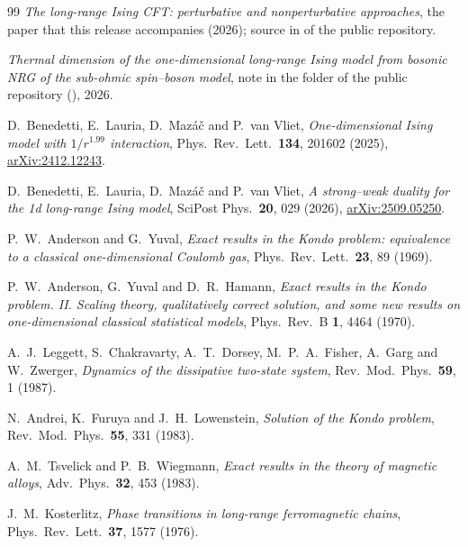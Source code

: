 \documentclass[11pt,a4paper]{article}
\numberwithin{equation}{section}
\newcommand{\file}[1]{\path{#1}}
\begin{document}
{}
\begin{thebibliography}{99}
\emph{The long-range Ising CFT: perturbative and nonperturbative approaches}, the paper that this
release accompanies (2026); source in \file{paper/} of the public repository.

\emph{Thermal dimension of the one-dimensional long-range Ising model from bosonic NRG of the sub-ohmic spin--boson
model}, note in the folder \file{NRG/} of the public repository (\file{NRG/note/lri_nrg_1d_note.pdf}), 2026.

D.~Benedetti, E.~Lauria, D.~Maz\'a\v c and P.~van Vliet,
\emph{One-dimensional Ising model with $1/r^{1.99}$ interaction},
Phys.\ Rev.\ Lett.\ \textbf{134}, 201602 (2025),
\href{https://arxiv.org/abs/2412.12243}{arXiv:2412.12243}.

D.~Benedetti, E.~Lauria, D.~Maz\'a\v c and P.~van Vliet,
\emph{A strong--weak duality for the 1d long-range Ising model},
SciPost Phys.\ \textbf{20}, 029 (2026),
\href{https://arxiv.org/abs/2509.05250}{arXiv:2509.05250}.

P.~W.~Anderson and G.~Yuval,
\emph{Exact results in the Kondo problem: equivalence to a classical one-dimensional Coulomb gas},
Phys.\ Rev.\ Lett.\ \textbf{23}, 89 (1969).

P.~W.~Anderson, G.~Yuval and D.~R.~Hamann,
\emph{Exact results in the Kondo problem. II. Scaling theory, qualitatively correct solution, and some new results on
one-dimensional classical statistical models}, Phys.\ Rev.\ B \textbf{1}, 4464 (1970).

A.~J.~Leggett, S.~Chakravarty, A.~T.~Dorsey, M.~P.~A.~Fisher, A.~Garg and W.~Zwerger,
\emph{Dynamics of the dissipative two-state system},
Rev.\ Mod.\ Phys.\ \textbf{59}, 1 (1987).

N.~Andrei, K.~Furuya and J.~H.~Lowenstein,
\emph{Solution of the Kondo problem},
Rev.\ Mod.\ Phys.\ \textbf{55}, 331 (1983).

A.~M.~Tsvelick and P.~B.~Wiegmann,
\emph{Exact results in the theory of magnetic alloys},
Adv.\ Phys.\ \textbf{32}, 453 (1983).

J.~M.~Kosterlitz,
\emph{Phase transitions in long-range ferromagnetic chains},
Phys.\ Rev.\ Lett.\ \textbf{37}, 1577 (1976).


\end{thebibliography}
\end{document}
